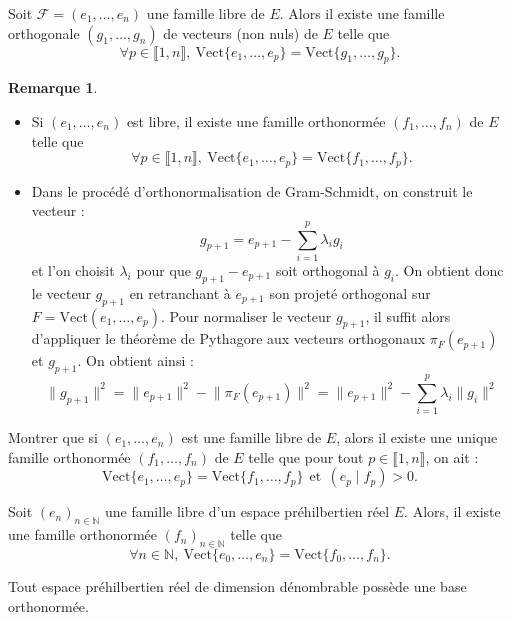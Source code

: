 \documentclass[french]{article}
\newcommand{\N}{\mathbb{N}}
\theoremstyle{plain}
\theoremstyle{definition}
\newtheorem*{rmq}{Remarque}
\theoremstyle{remark}
\begin{document}
\begin{thm}
	Soit $\mathcal{F}=(e_1,\ldots,e_n)$ une famille libre de $E$. Alors il existe une famille orthogonale $(g_1,\ldots,g_n)$ de vecteurs (non nuls) de $E$ telle que $$\forall p\in\llbracket 1,n\rrbracket,\ \text{Vect}\{e_1,\ldots,e_p\}=\text{Vect}\{g_1,\ldots,g_p\}.$$
\end{thm}

\begin{rmq}
	\begin{itemize}
		\item Si $(e_1,\ldots,e_n)$ est libre, il existe une famille orthonormée $(f_1,\ldots,f_n)$ de $E$ telle que $$\forall p\in\llbracket 1,n\rrbracket,\ \text{Vect}\{e_1,\ldots,e_p\}=\text{Vect}\{f_1,\ldots,f_p\}.$$
		\item Dans le procédé d'orthonormalisation de Gram-Schmidt, on construit le vecteur : $$g_{p+1}=e_{p+1}-\sum_{i=1}^{p}\lambda_ig_i$$ et l'on choisit $\lambda_i$ pour que $g_{p+1}-e_{p+1}$ soit orthogonal à $g_i$. On obtient donc le vecteur $g_{p+1}$ en retranchant à $e_{p+1}$ son projeté orthogonal sur $F=\text{Vect}(e_1,\ldots,e_p)$. Pour normaliser le vecteur $g_{p+1}$, il suffit alors d'appliquer le théorème de Pythagore aux vecteurs orthogonaux $\pi_F(e_{p+1})$ et $g_{p+1}$. On obtient ainsi : $$\lVert g_{p+1}\rVert^2=\lVert e_{p+1}\rVert^2-\lVert\pi_F(e_{p+1})\rVert^2=\lVert e_{p+1}\rVert^2-\sum_{i=1}^{p}\lambda_i\lVert g_i\rVert^2$$
	\end{itemize}
\end{rmq}

\begin{exo}
	Montrer que si $(e_1,\ldots,e_n)$ est une famille libre de $E$, alors il existe une unique famille orthonormée $(f_1,\ldots,f_n)$ de $E$ telle que pour tout $p\in\llbracket1,n\rrbracket$, on ait : $$\text{Vect}\{e_1,\ldots,e_p\}=\text{Vect}\{f_1,\ldots,f_p\}\ \ \text{et}\ \ (e_p\mid f_p)>0.$$
\end{exo}

\begin{prop}
	Soit $(e_n)_{n\in\N}$ une famille libre d'un espace préhilbertien réel $E$. Alors, il existe une famille orthonormée $(f_n)_{n\in\N}$ telle que $$\forall n\in\N,\ \text{Vect}\{e_0,\ldots,e_n\}=\text{Vect}\{f_0,\ldots,f_n\}.$$
\end{prop}

\begin{prop}[HP]
	Tout espace préhilbertien réel de dimension dénombrable possède une base orthonormée.
\end{prop}
\end{document}

